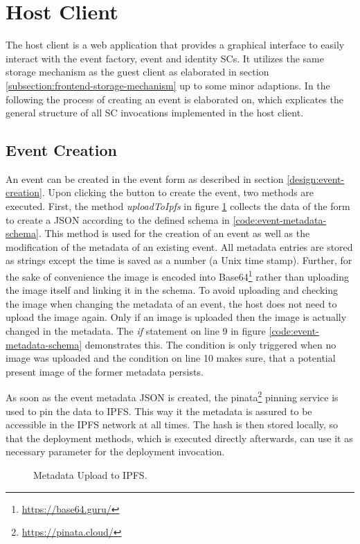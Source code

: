 \section{Host Client}
The host client is a web application that provides a graphical interface to easily interact with the event factory, event and identity SCs. It utilizes the same storage mechanism as the guest client as elaborated in section \ref{subsection:frontend-storage-mechanism} up to some minor adaptions. In the following the process of creating an event is elaborated on, which explicates the general structure of all SC invocations implemented in the host client.

\subsection{Event Creation}
An event can be created in the event form as described in section \ref{design:event-creation}. Upon clicking the button to create the event, two methods are executed. First, the method \textit{uploadToIpfs} in figure \ref{code:upload-metadata} collects the data of the form to create a JSON according to the defined schema in \ref{code:event-metadata-schema}. This method is used for the creation of an event as well as the modification of the metadata of an existing event. All metadata entries are stored as strings except the time is saved as a number (a Unix time stamp). Further, for the sake of convenience the image is encoded into Base64\footnote{\url{https://base64.guru/}} rather than uploading the image itself and linking it in the schema. To avoid uploading and checking the image when changing the metadata of an event, the host does not need to upload the image again. Only if an image is uploaded then the image is actually changed in the metadata. The \textit{if} statement on line 9 in figure \ref{code:event-metadata-schema} demonstrates this. The condition is only triggered when no image was uploaded and the condition on line 10 makes sure, that a potential present image of the former metadata persists.

As soon as the event metadata JSON is created, the pinata\footnote{\url{https://pinata.cloud/}} pinning service is used to pin the data to IPFS. This way it the metadata is assured to be accessible in the IPFS network at all times. The hash is then stored locally, so that the deployment methods, which is executed directly afterwards, can use it as necessary parameter for the deployment invocation.

\begin{figure}[H]
    
    \caption{Metadata Upload to IPFS.}
    \label{code:upload-metadata}
\end{figure}

